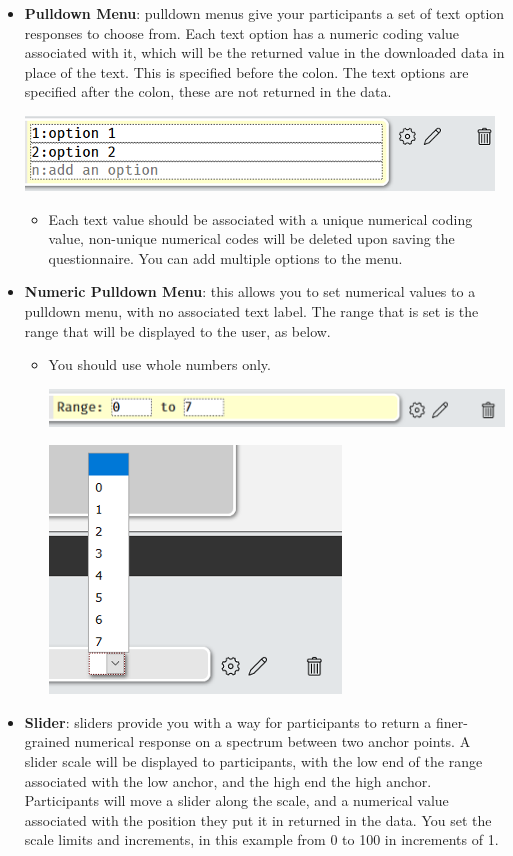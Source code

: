 \documentclass[]{book}
\providecommand{\tightlist}{%
  \setlength{\itemsep}{0pt}\setlength{\parskip}{0pt}}
\begin{document}
\begin{itemize}
\tightlist
\item
  \textbf{Pulldown Menu}: pulldown menus give your participants a set of text option responses to choose from. Each text option has a numeric coding value associated with it, which will be the returned value in the downloaded data in place of the text. This is specified before the colon. The text options are specified after the colon, these are not returned in the data.

  \includegraphics{images/screenshots/quest_mixed_3.png}

  \begin{itemize}
  \tightlist
  \item
    Each text value should be associated with a unique numerical coding value, non-unique numerical codes will be deleted upon saving the questionnaire. You can add multiple options to the menu.
  \end{itemize}
\item
  \textbf{Numeric Pulldown Menu}: this allows you to set numerical values to a pulldown menu, with no associated text label. The range that is set is the range that will be displayed to the user, as below.

  \begin{itemize}
  \tightlist
  \item
    You should use whole numbers only.

    \includegraphics{images/screenshots/quest_mixed_4.png}

    \includegraphics{images/screenshots/quest_mixed_5.png}
  \end{itemize}
\item
  \textbf{Slider}: sliders provide you with a way for participants to return a finer-grained numerical response on a spectrum between two anchor points. A slider scale will be displayed to participants, with the low end of the range associated with the low anchor, and the high end the high anchor. Participants will move a slider along the scale, and a numerical value associated with the position they put it in returned in the data. You set the scale limits and increments, in this example from 0 to 100 in increments of 1.


\end{itemize}
\end{document}
